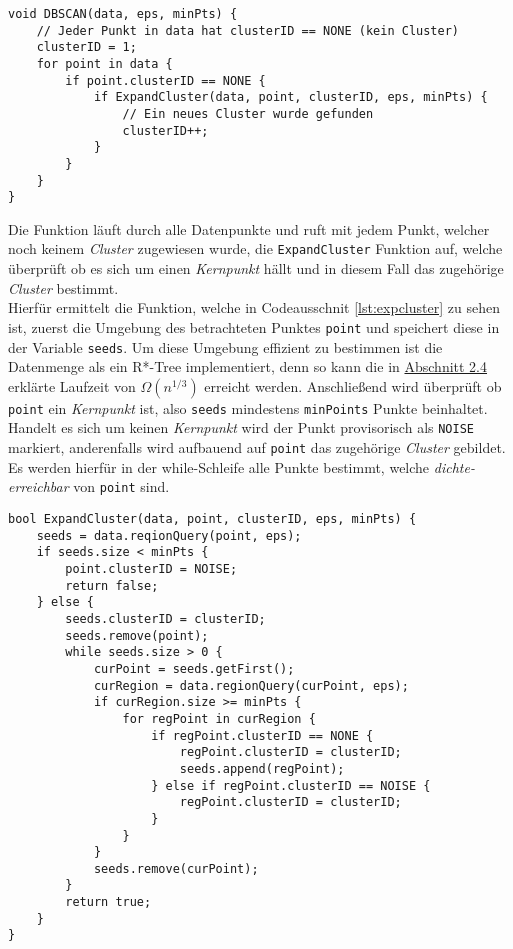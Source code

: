 \documentclass{lni}
\begin{document}

\begin{lstlisting}[caption={DBSCAN},label={lst:dbscan}]
void DBSCAN(data, eps, minPts) {
    // Jeder Punkt in data hat clusterID == NONE (kein Cluster)
    clusterID = 1;
    for point in data {
        if point.clusterID == NONE {
            if ExpandCluster(data, point, clusterID, eps, minPts) {
                // Ein neues Cluster wurde gefunden
                clusterID++;
            }
        }
    }
}
\end{lstlisting}


Die Funktion läuft durch alle Datenpunkte und ruft mit jedem Punkt, welcher noch keinem \textit{Cluster} zugewiesen wurde, die \lstinline{ExpandCluster} Funktion auf, welche überprüft ob es sich um einen \textit{Kernpunkt} hällt und in diesem Fall das zugehörige \textit{Cluster} bestimmt.\\
Hierfür ermittelt die Funktion, welche in Codeausschnit \ref{lst:expcluster} zu sehen ist, zuerst die Umgebung des betrachteten Punktes \lstinline{point} und speichert diese in der Variable \lstinline{seeds}.
Um diese Umgebung effizient zu bestimmen ist die Datenmenge als ein R*-Tree implementiert, denn so kann die in \hyperref[sec:rtree]{Abschnitt 2.4} erklärte Laufzeit von $\Omega(n^{1/3})$ erreicht werden. Anschließend wird überprüft ob \lstinline{point} ein \textit{Kernpunkt} ist, also \lstinline{seeds} mindestens \lstinline{minPoints} Punkte beinhaltet. Handelt es sich um keinen \textit{Kernpunkt} wird der Punkt provisorisch als \lstinline{NOISE} markiert, anderenfalls wird aufbauend auf \lstinline{point} das zugehörige \textit{Cluster} gebildet. Es werden hierfür in der while-Schleife alle Punkte bestimmt, welche \textit{dichte-erreichbar} von \lstinline{point} sind.


\newpage

\begin{lstlisting}[caption={ExpandCluster},label={lst:expcluster}]
bool ExpandCluster(data, point, clusterID, eps, minPts) {
    seeds = data.reqionQuery(point, eps);
    if seeds.size < minPts {
        point.clusterID = NOISE;
        return false;
    } else {
        seeds.clusterID = clusterID;
        seeds.remove(point);
        while seeds.size > 0 {
            curPoint = seeds.getFirst();
            curRegion = data.regionQuery(curPoint, eps);
            if curRegion.size >= minPts {
                for regPoint in curRegion {
                    if regPoint.clusterID == NONE {
                        regPoint.clusterID = clusterID;
                        seeds.append(regPoint);
                    } else if regPoint.clusterID == NOISE {
                        regPoint.clusterID = clusterID;
                    }
                }
            }
            seeds.remove(curPoint);
        }
        return true;
    }
}
\end{lstlisting}
\end{document}
